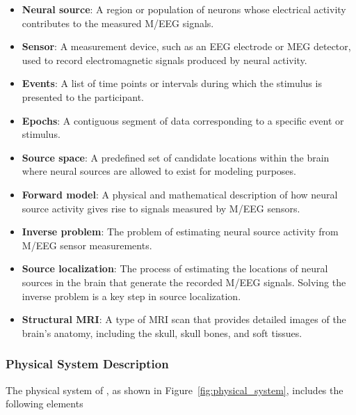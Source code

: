 \documentclass[12pt]{article}
\begin{document}
\begin{itemize}

    \item \textbf{Neural source}: A region or population of neurons whose electrical activity contributes to the measured M/EEG signals.
    
    \item \textbf{Sensor}: A measurement device, such as an EEG electrode or MEG detector, used to record electromagnetic signals produced by neural activity.

    \item \textbf{Events}: A list of time points or intervals during which the stimulus is presented to the participant.
    
    \item \textbf{Epochs}: A contiguous segment of data corresponding to a specific event or stimulus.
    
    \item \textbf{Source space}: A predefined set of candidate locations within the brain where neural sources are allowed to exist for modeling purposes.

    \item \textbf{Forward model}: A physical and mathematical description of how neural source activity gives rise to signals measured by M/EEG sensors.
    
    \item \textbf{Inverse problem}: The problem of estimating neural source activity from M/EEG sensor measurements.
        
    \item \textbf{Source localization}: The process of estimating the locations of neural sources in the brain that generate the recorded M/EEG signals. Solving the inverse problem is a key step in source localization.

    \item \textbf{Structural MRI}: A type of MRI scan that provides detailed images of the brain's anatomy, including the skull, skull bones, and soft tissues.

\end{itemize}




\subsubsection{Physical System Description} \label{sec_phySystDescrip}


The physical system of \progname{}, as shown in Figure~\ref{fig:physical_system}, includes the following elements
\end{document}
